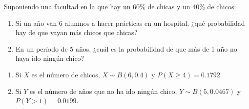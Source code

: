 {Suponiendo una facultad en la que hay un 60\% de chicas y un 40\% de chicos:
\begin{enumerate}
\item  Si un año van 6 alumnos a hacer prácticas en un hospital, ¿qué probabilidad hay de que vayan más chicos que chicas?
\item En un período de 5 años, ¿cuál es la probabilidad de que más de 1 año no haya ido ningún chico?
\end{enumerate}
}
{\begin{enumerate}
\item Si $X$ es el número de chicos, $X\sim B(6,0.4)$  y $P(X\geq 4)=0.1792$.
\item Si $Y$ es el número de años que no ha ido ningún chico, $Y \sim B(5,0.0467)$ y $P(Y>1)=0.0199$.
\end{enumerate}
}
